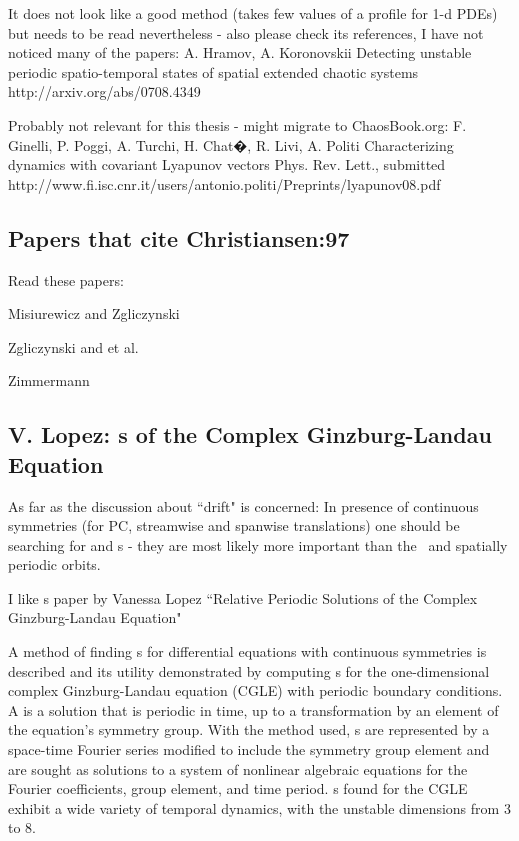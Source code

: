 It does not look like a good method (takes few values of a profile
for 1-d PDEs) but needs to be read nevertheless - also please
check its references, I have not noticed many of the papers:
%
A. Hramov, A. Koronovskii
Detecting unstable periodic spatio-temporal states of spatial
extended chaotic systems
http://arxiv.org/abs/0708.4349

Probably not relevant for this thesis - might migrate to ChaosBook.org:
F. Ginelli, P. Poggi, A. Turchi, H. Chat�, R. Livi, A. Politi
Characterizing dynamics with covariant Lyapunov vectors
Phys. Rev. Lett., submitted
http://www.fi.isc.cnr.it/users/antonio.politi/Preprints/lyapunov08.pdf

\subsection{Papers that cite Christiansen:97}

Read these papers:

Misiurewicz and Zgliczynski

Zgliczynski and et al.

Zimmermann



\subsection{V. Lopez:
        {\Rpo s} of the Complex Ginzburg-Landau Equation}

As far as the discussion about ``drift" is concerned:
In presence of continuous symmetries (for PC, streamwise and
spanwise translations) one should be searching for
{\reqva} and
{\rpo s} - they are most likely more important than
the \eqva\ and spatially periodic orbits.

I like {\rpo s} paper by
Vanessa Lopez %
``Relative Periodic Solutions of the Complex Ginzburg-Landau Equation"


A method of finding {\rpo s} for differential equations with
continuous symmetries is described and its utility demonstrated by computing
{\rpo s} for the one-dimensional complex Ginzburg-Landau
equation (CGLE) with periodic boundary conditions.  A {\rpo} is
a solution that is periodic in time, up to a transformation by an element of the
equation's symmetry group.  With the method used, {\rpo s} are
represented by a space-time Fourier series modified to include the symmetry
group element and are sought as solutions to a system of nonlinear algebraic
equations for the Fourier coefficients, group element, and time period.
{\Rpo s} found for the CGLE exhibit a wide variety of temporal
dynamics,
with the %
unstable dimensions from 3 to 8.


